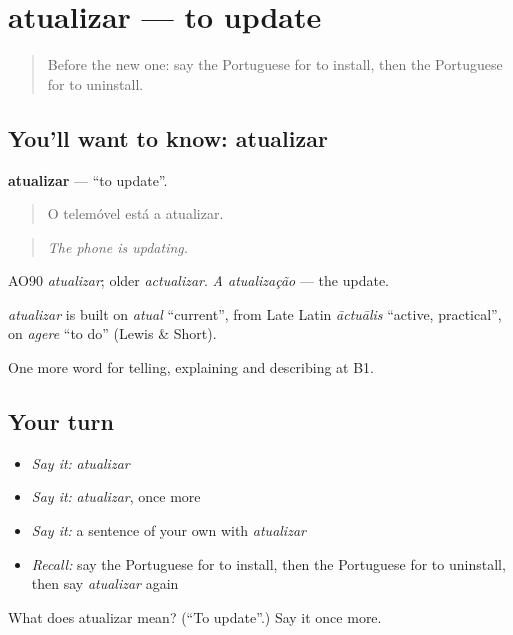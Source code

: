 \section[atualizar]{atualizar — to update}

\label{lesson:PT-C397-atualizar}



\begin{quote}
Before the new one: say the Portuguese for to install, then the Portuguese for to uninstall.
\end{quote}

\subsection*{You'll want to know: atualizar}
\textbf{atualizar} — \textquotedblleft{}to update\textquotedblright{}.

\begin{quote}
O telemóvel está a atualizar.
\end{quote}

\begin{quote}
\emph{The phone is updating.}
\end{quote}

AO90 \emph{atualizar}; older \emph{actualizar}. \emph{A atualização} — the update.

\begin{cousinweb}
\emph{atualizar} is built on \emph{atual} \textquotedblleft{}current\textquotedblright{}, from Late Latin \emph{āctuālis} \textquotedblleft{}active, practical\textquotedblright{}, on \emph{agere} \textquotedblleft{}to do\textquotedblright{} (Lewis \& Short).
\end{cousinweb}

\begin{grammarlens}[title={What you've built}]
One more word for telling, explaining and describing at B1.
\end{grammarlens}

\subsection*{Your turn}
\begin{itemize}
\raggedright
  \item \emph{Say it:} \emph{atualizar}
  \item \emph{Say it:} \emph{atualizar}, once more
  \item \emph{Say it:} a sentence of your own with \emph{atualizar}
  \item \emph{Recall:} say the Portuguese for to install, then the Portuguese for to uninstall, then say \emph{atualizar} again
\end{itemize}

\begin{tcolorbox}[breakable,colback=teal!4,colframe=teal!35!black,title={Before you move on}]
What does atualizar mean? (\textquotedblleft{}To update\textquotedblright{}.) Say it once more.
\end{tcolorbox}
